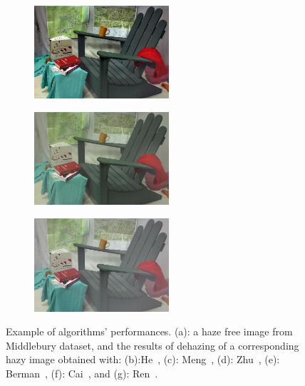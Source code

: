 \begin{figure}[htb]
\begin{subfigure}[b]{0.45\linewidth}
  \centering
  \centerline{\includegraphics[width=5cm]{hazerd/middlebury/dehaze_berman}}
  \subcaption{}
\end{subfigure}
\vfill
\begin{subfigure}[b]{0.45\linewidth}
  \centering
  \centerline{\includegraphics[width=5cm]{hazerd/middlebury/dehaze_cai}}
  \subcaption{}
\end{subfigure}
\hfill
\begin{subfigure}[b]{0.45\linewidth}
  \centering
  \centerline{\includegraphics[width=5cm]{hazerd/middlebury/dehaze_ren}}
  \subcaption{}
\end{subfigure}
\vfill
\caption{Example of algorithms' performances. (a): a haze free image from Middlebury dataset, and the results of dehazing of a corresponding hazy image obtained with: (b):He~\cite{he2011single}, (c): Meng~\cite{meng2013efficient}, (d): Zhu~\cite{zhu2015fast}, (e): Berman~\cite{berman2016non}, (f): Cai~\cite{cai2016dehazenet}, and (g): Ren~\cite{Ren-ECCV-2016}.}
\label{fig:3.exmaple.middlebury}
\end{figure}
